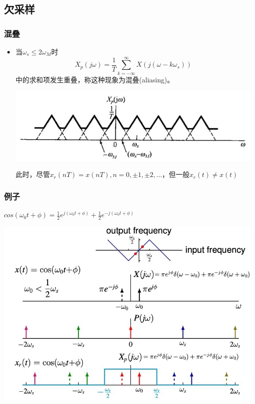 \documentclass[CJKutf8,dvipsnames,table]{beamer}
\begin{document}
\begin{CJK*}{UTF8}{song}
	\section{欠采样}
	
  \begin{frame}
    \frametitle{混叠}
    \begin{itemize}
    \item 当$\omega_s \leq 2\omega_M$时
    \[
    	X_p(j\omega)=\frac{1}{T}\sum_{k=-\infty}^{\infty} X(j(\omega-k\omega_s))
    \]
    中的求和项发生重叠，称这种现象为混叠(aliasing)。
    \begin{center}
      \includegraphics[scale=.5]{ss-c-f7-3d}
    \end{center}
    此时，尽管$x_r(nT)=x(nT), n=0, \pm1, \pm2, \hdots$，但一般$x_r(t) \neq x(t)$
    \end{itemize}
  \end{frame} 
  
  \begin{frame}
    \frametitle{例子}
	$cos(\omega_0 t + \phi) = \frac{1}{2}e^{j(\omega_0 t+ \phi)}+\frac{1}{2}e^{-j(\omega_0 t+ \phi)}	$

    \begin{center}
    \includegraphics[scale=.42]{aliasing-example-1}
    \end{center}


\end{frame}
\end{CJK*}
\end{document}
